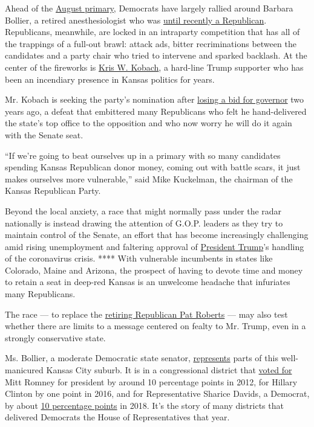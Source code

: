 Ahead of the
\href{https://www.nytimes.com/2020/08/04/us/elections/primary-election-michigan-arizona-kansas.html}{August
primary}, Democrats have largely rallied around Barbara Bollier, a
retired anesthesiologist who was
\href{https://www.kansas.com/news/politics-government/article222990385.html}{until
recently a Republican}. Republicans, meanwhile, are locked in an
intraparty competition that has all of the trappings of a full-out
brawl: attack ads, bitter recriminations between the candidates and a
party chair who tried to intervene and sparked backlash. At the center
of the fireworks is
\href{https://www.nytimes.com/2020/08/03/us/politics/kris-kobach-kansas-senate-primary.html}{Kris
W. Kobach}, a hard-line Trump supporter who has been an incendiary
presence in Kansas politics for years.

Mr. Kobach is seeking the party's nomination after
\href{https://www.nytimes.com/2018/11/06/us/laura-kelly-wins-kansas-governors-race.html}{losing
a bid for governor} two years ago, a defeat that embittered many
Republicans who felt he hand-delivered the state's top office to the
opposition and who now worry he will do it again with the Senate seat.

``If we're going to beat ourselves up in a primary with so many
candidates spending Kansas Republican donor money, coming out with
battle scars, it just makes ourselves more vulnerable,'' said Mike
Kuckelman, the chairman of the Kansas Republican Party.

Beyond the local anxiety, a race that might normally pass under the
radar nationally is instead drawing the attention of G.O.P. leaders as
they try to maintain control of the Senate, an effort that has become
increasingly challenging amid rising unemployment and faltering approval
of
\href{https://www.nytimes.com/interactive/2020/us/elections/donald-trump.html}{President
Trump}'s handling of the coronavirus crisis. **** With vulnerable
incumbents in states like Colorado, Maine and Arizona, the prospect of
having to devote time and money to retain a seat in deep-red Kansas is
an unwelcome headache that infuriates many Republicans.

The race --- to replace the
\href{https://www.nytimes.com/2019/01/04/us/politics/roberts-kansas-senate.html}{retiring
Republican Pat Roberts} --- may also test whether there are limits to a
message centered on fealty to Mr. Trump, even in a strongly conservative
state.

Ms. Bollier, a moderate Democratic state senator,
\href{http://www.kslegislature.org/li/m/pdf/district_maps/district_map_s_007.pdf}{represents}
parts of this well-manicured Kansas City suburb. It is in a
congressional district that
\href{https://www.dailykos.com/stories/2012/11/19/1163009/-Daily-Kos-Elections-presidential-results-by-congressional-district-for-the-2012-2008-elections}{voted
for} Mitt Romney for president by around 10 percentage points in 2012,
for Hillary Clinton by one point in 2016, and for Representative Sharice
Davids, a Democrat, by about
\href{https://www.politico.com/election-results/2018/kansas/}{10
percentage points} in 2018. It's the story of many districts that
delivered Democrats the House of Representatives that year.

